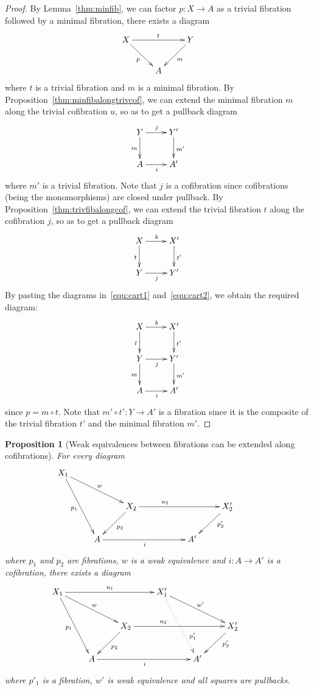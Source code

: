 \documentclass[reqno,10pt,a4paper,oneside]{amsart}
\newcommand{\xycenter}[1]{\vcenter{\hbox{\xymatrix{#1}}}}
\newcommand{\ie}{\text{i.e.\ }}
\newtheorem{proposition}[theorem]{Proposition}
\theoremstyle{definition}
\newcommand{\co}{\colon}
\begin{document}
\begin{proof} By Lemma~\ref{thm:minfib}, we can factor $p \co X \to A$ as a trivial fibration followed by a minimal
fibration, \ie there exists a diagram
\begin{equation*}
\xycenter{
X \ar[rr]^{t} \ar[dr]_p & & Y \ar[dl]^{m} \\
 & A & }
 \end{equation*}
 where $t$ is a trivial fibration and $m$ is a minimal fibration. By Proposition~\ref{thm:minfibalongtrivcof}, we can extend the minimal fibration
 $m$ along the trivial cofibration $u$, so as to get a pullback diagram
 \begin{equation}
 \label{equ:cart1}
 \xycenter{
 Y \ar[d]_{m} \ar[r]^{j} & Y' \ar[d]^{m'} \\
 A \ar[r]_i & A'}
 \end{equation}
 where $m'$ is a trivial fibration. Note that $j$ is a cofibration since cofibrations (being the 
 monomorphisms) are closed under pullback.  By Proposition~\ref{thm:trivfibalongcof}, we can  extend the trivial fibration $t$ along the cofibration $j$,
 so as to get a pullback diagram
 \begin{equation}
  \label{equ:cart2}
 \xycenter{
 X \ar[r]^k \ar[d]_t & X' \ar[d]^{t'} \\
 Y \ar[r]_{j} & Y'}
 \end{equation}
 By pasting the diagrams in~\eqref{equ:cart1} and~\eqref{equ:cart2}, we obtain the 
 required diagram:
 \[
 \xymatrix{
 X \ar[r]^k \ar[d]_t & X' \ar[d]^{t'} \\
 Y \ar[r]_{j} \ar[d]_{m} & Y' \ar[d]^{m'} \\ 
 A \ar[r]_i & A'}
 \]
since $p = m \circ t$. Note that $m' \circ t' \co Y \to A'$ is a fibration since it is the composite of
the trivial fibration $t'$ and the minimal fibration $m'$.
\end{proof}


\begin{proposition}[Weak equivalences between fibrations can be extended along cofibrations]
\label{thm:weakalongcof}
For every diagram
 \[
 \xymatrix{
 X_1 \ar[ddr]_{p_1}  \ar[drr]^{w}  &  & &  & & \\
  & & X_2 \ar[dl]^{p_2} \ar[rrr]^(.35){u_2} & & &  X_2' \ar[dl]^(.35){p'_2} \\
  & A \ar[rrr]_{i}  & & &A' & & }
  \]
  where $p_1$ and $p_2$ are fibrations, $w$ is a weak equivalence and $i \co A \to A'$ is a cofibration,  
  there exists a diagram
   \[
 \xymatrix{
 X_1 \ar[ddr]_{p_1}  \ar[drr]^{w} \ar[rrr]^{u_1} &  & & X_1' \ar[drr]^{w'}  \ar@{.>}[ddr]^(.7){p_1'}  & & \\
  & & X_2 \ar[dl]^{p_2} \ar[rrr]^(.35){u_2} & & &  X_2' \ar[dl]^(.35){p'_2} \\
  & A \ar[rrr]_{i}  & & &A' & & }
  \]
where $p'_1$ is a fibration, $w'$ is weak equivalence and all squares are pullbacks.
\end{proposition}
\end{document}
